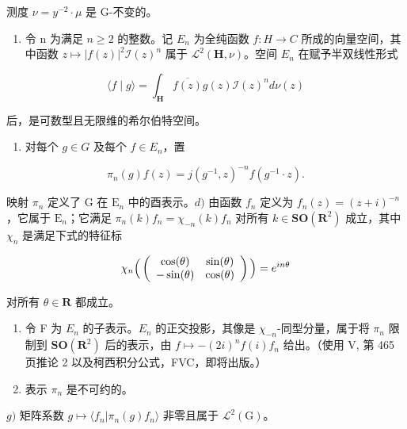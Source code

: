 测度 \(\nu = y^{-2} \cdot \mu\) 是 G-不变的。

\begin{enumerate}
\def\labelenumi{\alph{enumi})}
\setcounter{enumi}{1}
\tightlist
\item
  令 n 为满足 \(n \geqslant 2\) 的整数。记 \(E_{n}\) 为全纯函数 \(f: H \to C\) 所成的向量空间，其中函数 \(z \mapsto |f(z)|^{2} \mathcal{I}(z)^{n}\) 属于 \(\mathcal{L}^{2}(\mathbf{H}, \nu)\)。空间 \(E_{n}\) 在赋予半双线性形式
\end{enumerate}

\[
\langle f \mid g \rangle = \int_ {\mathbf {H}} \overline {{f (z)}} g (z) \mathcal {I} (z) ^ {n} d \nu (z)
\]

后，是可数型且无限维的希尔伯特空间。

\begin{enumerate}
\def\labelenumi{\alph{enumi})}
\setcounter{enumi}{2}
\tightlist
\item
  对每个 \(g \in G\) 及每个 \(f \in E_{n}\)，置
\end{enumerate}

\[
\pi_ {n} (g) f (z) = j (g ^ {- 1}, z) ^ {- n} f (g ^ {- 1} \cdot z).
\]

映射 \(\pi_n\) 定义了 G 在 \(\mathrm{E}_n\) 中的酉表示。\(d)\) 由函数 \(f_n\) 定义为 \(f_n(z) = (z + i)^{-n}\)，它属于 \(\mathrm{E}_n\)；它满足 \(\pi_n(k)f_n = \chi_{-n}(k)f_n\) 对所有 \(k \in \mathbf{SO}(\mathbf{R}^2)\) 成立，其中 \(\chi_n\) 是满足下式的特征标

\[
\chi_ {n} \Big (\left( \begin{array}{c c} \cos (\theta) & \sin (\theta) \\ - \sin (\theta) & \cos (\theta) \end{array} \right) \Big) = e ^ {i n \theta}
\]

对所有 \(\theta\in\mathbf{R}\) 都成立。

\begin{enumerate}
\def\labelenumi{\alph{enumi})}
\setcounter{enumi}{4}
\item
  令 F 为 \(E_{n}\) 的子表示。\(E_{n}\) 的正交投影，其像是 \(\chi_{-n}\)-同型分量，属于将 \(\pi_{n}\) 限制到 \(\mathbf{SO}(\mathbf{R}^{2})\) 后的表示，由 \(f \mapsto -(2i)^{n}f(i)f_{n}\) 给出。（使用 V, 第 465 页推论 2 以及柯西积分公式，FVC，即将出版。）
\item
  表示 \(\pi_n\) 是不可约的。
\end{enumerate}

\(g)\) 矩阵系数 \(g \mapsto \langle f_n | \pi_n(g)f_n \rangle\) 非零且属于 \(\mathcal{L}^2(\mathrm{G})\)。

